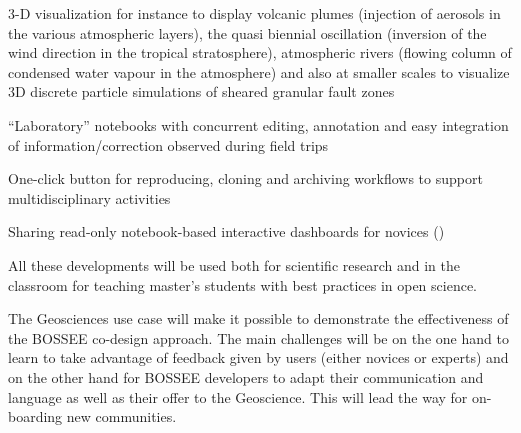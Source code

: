\begin{task}[
  title=Geosciences application,
  id=geoscience,
  lead=UIO,
  PM=24,
  wphases={0-48},
  partners={UIO,QS,SRL}
]
\begin{compactitem}
  \item 3-D visualization for instance to display volcanic plumes
    (injection of aerosols in the various atmospheric layers), the
    quasi biennial oscillation (inversion of the wind direction in the
    tropical stratosphere), atmospheric rivers (flowing column of
    condensed water vapour in the atmosphere) and also at smaller
    scales to visualize 3D discrete particle simulations of sheared
    granular fault zones 
  \item “Laboratory” notebooks with concurrent editing, annotation and
    easy integration of information/correction observed during field
    trips 
  \item One-click button for reproducing, cloning and archiving
    workflows to support multidisciplinary activities 
   \item Sharing read-only notebook-based interactive dashboards for
     novices 
    ()
  \end{compactitem}

  All these developments will be used both for scientific research and
  in the classroom for teaching master's students with best practices
  in open science.

  The Geosciences use case will make it possible to demonstrate the
  effectiveness of the BOSSEE co-design approach. The main challenges
  will be on the one hand to learn to take advantage of feedback given
  by users (either novices or experts) and on the other hand for
  BOSSEE developers to adapt their communication and language as well
  as their offer to the Geoscience. This will lead the way for
  on-boarding new communities.

\end{task}
